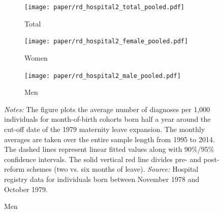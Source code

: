 \documentclass[11pt, a4paper]{article} %
\begin{document}







\begin{landscape}
	\vspace*{\fill}
	\begin{figure}
		[H]\centering
		\caption{Reduced form for hospital admission (pooled)}\label{fig: rf_hospital2_pooled}
		\begin{subfigure}[h]{0.31\linewidth}\centering\caption{Total}
		\texttt{[image: paper/rd\_hospital2\_total\_pooled.pdf]}
		\end{subfigure}
		\begin{subfigure}[h]{0.31\linewidth}\centering\caption{Women}
		\texttt{[image: paper/rd\_hospital2\_female\_pooled.pdf]}
		\end{subfigure}
		\begin{subfigure}[h]{0.31\linewidth}\centering\caption{Men}
		\texttt{[image: paper/rd\_hospital2\_male\_pooled.pdf]}
		\end{subfigure}
			\scriptsize
			\begin{minipage}{0.95\linewidth}
				\emph{Notes:} The figure plots the average number of diagnoses per 1,000 individuals for month-of-birth cohorts born half a year around the cut-off date of the 1979 maternity leave expansion. The monthly averages are taken over the entire sample length from 1995 to 2014. The dashed lines represent linear fitted values along with 90\%/95\% confidence intervals. The solid vertical red line divides pre- and post-reform schemes (two vs. six months of leave).\newline
				\emph{Source:} Hospital registry data for individuals born between November 1978 and October 1979.
			\end{minipage}
	\end{figure}
	\vspace*{\fill}\clearpage
\end{landscape}
\end{document}
